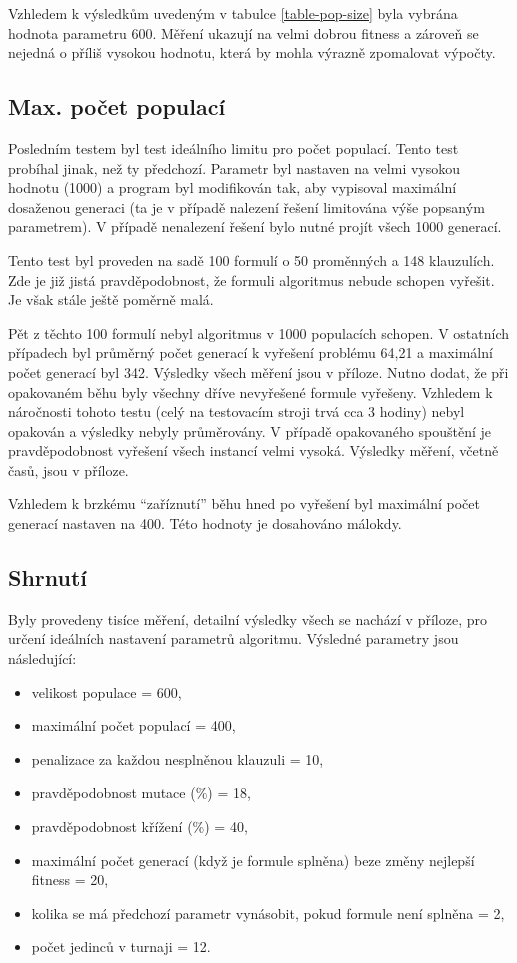 \documentclass[a4paper]{article}
\begin{document}
		Vzhledem k výsledkům uvedeným v tabulce \ref{table-pop-size} byla vybrána hodnota parametru 600. Měření ukazují na velmi dobrou fitness a zároveň se nejedná o příliš vysokou hodnotu, která by mohla výrazně zpomalovat výpočty.
	
	\subsection{Max. počet populací}
		Posledním testem byl test ideálního limitu pro počet populací. Tento test probíhal jinak, než ty předchozí. Parametr byl nastaven na velmi vysokou hodnotu (1000) a program byl modifikován tak, aby vypisoval maximální dosaženou generaci (ta je v případě nalezení řešení limitována výše popsaným parametrem). V případě nenalezení řešení bylo nutné projít všech 1000 generací.	
		
		Tento test byl proveden na sadě 100 formulí o 50 proměnných a 148 klauzulích. Zde je již jistá pravděpodobnost, že formuli algoritmus nebude schopen vyřešit. Je však stále ještě poměrně malá.
		
	Pět z těchto 100 formulí nebyl algoritmus v 1000 populacích schopen. V ostatních případech byl průměrný počet generací k vyřešení problému 64,21 a maximální počet generací byl 342. Výsledky všech měření jsou v příloze. Nutno dodat, že při opakovaném běhu byly všechny dříve nevyřešené formule vyřešeny. Vzhledem k náročnosti tohoto testu (celý na testovacím stroji trvá cca 3 hodiny) nebyl opakován a výsledky nebyly průměrovány. V případě opakovaného spouštění je pravděpodobnost vyřešení všech instancí velmi vysoká. Výsledky měření, včetně časů, jsou v příloze.
	
	Vzhledem k brzkému \enquote{zaříznutí} běhu hned po vyřešení byl maximální počet generací nastaven na 400. Této hodnoty je dosahováno málokdy.
	
	\subsection{Shrnutí}
		Byly provedeny tisíce měření, detailní výsledky všech se nachází v příloze, pro určení ideálních nastavení parametrů algoritmu. Výsledné parametry jsou následující:
		\begin{itemize}
			\item velikost populace = 600,
			\item maximální počet populací = 400,
			\item penalizace za každou nesplněnou klauzuli = 10,
			\item pravděpodobnost mutace (\%) = 18,
			\item pravděpodobnost křížení (\%) = 40,
			\item maximální počet generací (když je formule splněna) beze změny nejlepší fitness = 20,
			\item kolika se má předchozí parametr vynásobit, pokud formule není splněna = 2,
			\item počet jedinců v turnaji = 12.
		\end{itemize}
	
\end{document}
